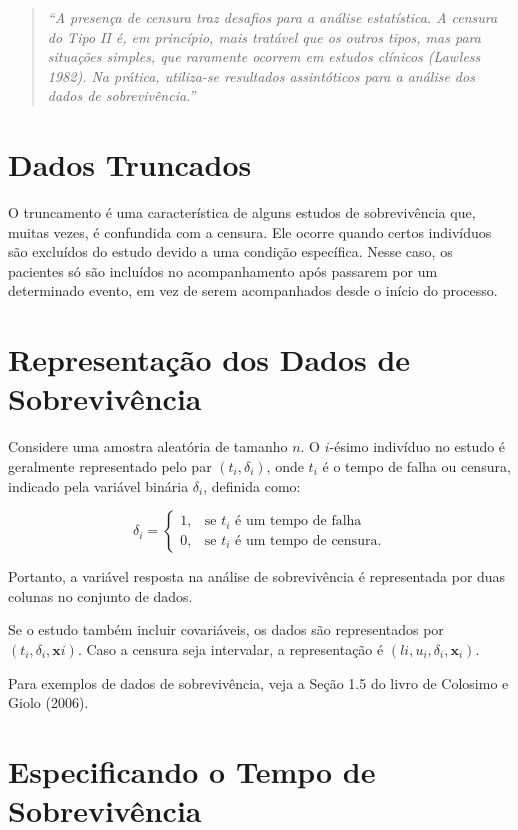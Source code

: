 \documentclass[
  12pt,
  letterpaper,
  DIV=11,
  numbers=noendperiod]{scrreprt}
\begin{document}
\begin{quote}
\emph{``A presença de censura traz desafios para a análise estatística.
A censura do Tipo II é, em princípio, mais tratável que os outros tipos,
mas para situações simples, que raramente ocorrem em estudos clínicos
(Lawless 1982). Na prática, utiliza-se resultados assintóticos para a
análise dos dados de sobrevivência.''}
\end{quote}

\section{Dados Truncados}\label{dados-truncados}

O truncamento é uma característica de alguns estudos de sobrevivência
que, muitas vezes, é confundida com a censura. Ele ocorre quando certos
indivíduos são excluídos do estudo devido a uma condição específica.
Nesse caso, os pacientes só são incluídos no acompanhamento após
passarem por um determinado evento, em vez de serem acompanhados desde o
início do processo.

\section{Representação dos Dados de Sobrevivência}\label{sec-ReprDados}

Considere uma amostra aleatória de tamanho \(n\). O \(i\)-ésimo
indivíduo no estudo é geralmente representado pelo par
\((t_{i}, \delta_{i})\), onde \(t_{i}\) é o tempo de falha ou censura,
indicado pela variável binária \(\delta_{i}\), definida como:

\[
\delta_{i} = \begin{cases}
1, & \text{se } t_{i} \text{ é um tempo de falha} \\
0, & \text{se } t_{i} \text{ é um tempo de censura}.
\end{cases}
\]

Portanto, a variável resposta na análise de sobrevivência é representada
por duas colunas no conjunto de dados.

Se o estudo também incluir covariáveis, os dados são representados por
\((t_{i}, \delta_{i}, \mathbf{x}i)\). Caso a censura seja intervalar, a
representação é \((l{i}, u_{i}, \delta_{i}, \mathbf{x}_i)\).

Para exemplos de dados de sobrevivência, veja a Seção 1.5 do livro de
Colosimo e Giolo (2006).

\section{Especificando o Tempo de
Sobrevivência}\label{especificando-o-tempo-de-sobrevivuxeancia}
\end{document}
